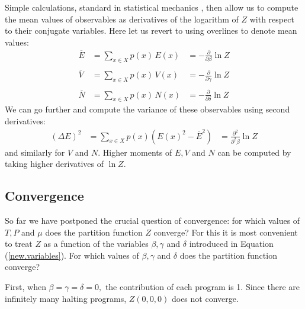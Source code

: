 \documentclass{article}
\begin{document}
Simple calculations, standard in statistical mechanics 
\cite{Reif}, then allow us to compute the mean values of 
observables as derivatives of the logarithm of $Z$ 
with respect to their conjugate variables.    Here
let us revert to using overlines to denote mean values:
\[
\begin{array}{ccc}
   \overline{E} &= 
   \displaystyle{\sum_{x \in X} p(x) \, E(x)} &=
- \displaystyle{\frac{\partial}{\partial \beta} \ln Z}  \\  
\\
   \overline{V} &=
   \displaystyle{\sum_{x \in X} p(x) \, V(x)} &=
- \displaystyle{\frac{\partial}{\partial \gamma} \ln Z}  \\  
\\
   \overline{N} &=
   \displaystyle{\sum_{x \in X} p(x) \, N(x)} &=
- \displaystyle{\frac{\partial}{\partial \delta} \ln Z}  
\end{array}
\]
We can go further and compute the variance of these observables
using second derivatives:
\[       
\begin{array}{ccc}
   {(\Delta E)^2} &=
\displaystyle{\sum_{x \in X} p(x) (E(x)^2 - \overline{E}^2)} &=
\displaystyle{ \frac{\partial^2}{\partial^2 \beta} \ln Z } 
\end{array}
\]
and similarly for $V$ and $N$.  Higher moments of $E, V$ and 
$N$ can be computed by taking higher derivatives
of $\ln Z$.  

\subsection{Convergence}

So far we have postponed the crucial question of convergence:
for which values of $T,P$ and $\mu$ does the partition function 
$Z$ converge?  For this it is most convenient to treat $Z$ as
a function of the variables $\beta, \gamma$ and $\delta$
introduced in Equation (\ref{new.variables}).  For which 
values of $\beta, \gamma$ and $\delta$ does the partition
function converge?   

First, when $\beta = \gamma = \delta = 0,$ the contribution of each program 
is 1.   Since there are infinitely many halting programs, $Z(0,0,0)$ does 
not converge.
\end{document}
